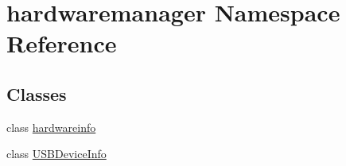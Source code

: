 \hypertarget{namespacehardwaremanager}{}\section{hardwaremanager Namespace Reference}
\label{namespacehardwaremanager}
\subsection*{Classes}
\begin{DoxyCompactItemize}
\item 
class \hyperlink{classhardwaremanager_1_1hardwareinfo}{hardwareinfo}
\item 
class \hyperlink{classhardwaremanager_1_1_u_s_b_device_info}{U\+S\+B\+Device\+Info}
\end{DoxyCompactItemize}
